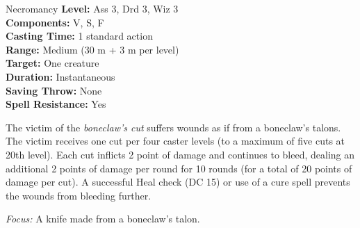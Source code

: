 {Necromancy}
{
	\textbf{Level:}
	Ass 3, Drd 3, Wiz 3\\
	\textbf{Components:}
	V, S, F\\
	\textbf{Casting Time:}
	1 standard action\\
	\textbf{Range:}
	Medium (30 m + 3 m per level)\\
	\textbf{Target:}
	One creature\\
	\textbf{Duration:}
	Instantaneous\\
	\textbf{Saving Throw:}
	None\\
	\textbf{Spell Resistance:}
	Yes\\
}
{
	The victim of the \emph{boneclaw's cut} suffers wounds as if from a boneclaw's talons. The victim receives one cut per four caster levels (to a maximum of five cuts at 20th level). Each cut inflicts 2 point of damage and continues to bleed, dealing an additional 2 points of damage per round for 10 rounds (for a total of 20 points of damage per cut). A successful Heal check (DC 15) or use of a cure spell prevents the wounds from bleeding further.

	\textit{Focus:} A knife made from a boneclaw's talon.
}
